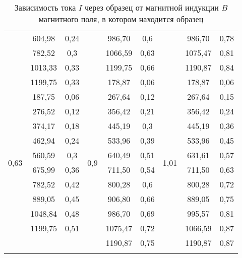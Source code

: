 \begin{longtable}{|c|c|c||c|c|c||c|c|c|}
                       & 604,98  & 0,24 &                       & 986,70  & 0,6  &                        & 986,70  & 0,78 \\ \cline{2-3} \cline{5-6} \cline{8-9} 
                       & 782,52  & 0,3  &                       & 1066,59 & 0,63 &                        & 1075,47 & 0,81 \\ \cline{2-3} \cline{5-6} \cline{8-9} 
                       & 1013,33 & 0,33 &                       & 1199,75 & 0,66 &                        & 1190,87 & 0,84 \\ \cline{2-9} 
                       & 1199,75 & 0,33 & \multirow{12}{*}{0,9} & 178,87  & 0,06 & \multirow{12}{*}{1,01} & 178,87  & 0,06 \\ \cline{1-3} \cline{5-6} \cline{8-9} 
\multirow{10}{*}{0,63} & 187,75  & 0,06 &                       & 267,64  & 0,12 &                        & 267,64  & 0,15 \\ \cline{2-3} \cline{5-6} \cline{8-9} 
                       & 276,52  & 0,12 &                       & 356,42  & 0,21 &                        & 356,42  & 0,24 \\ \cline{2-3} \cline{5-6} \cline{8-9} 
                       & 374,17  & 0,18 &                       & 445,19  & 0,3  &                        & 445,19  & 0,36 \\ \cline{2-3} \cline{5-6} \cline{8-9} 
                       & 462,94  & 0,24 &                       & 533,96  & 0,39 &                        & 533,96  & 0,45 \\ \cline{2-3} \cline{5-6} \cline{8-9} 
                       & 560,59  & 0,3  &                       & 640,49  & 0,51 &                        & 631,61  & 0,57 \\ \cline{2-3} \cline{5-6} \cline{8-9} 
                       & 675,99  & 0,36 &                       & 711,50  & 0,54 &                        & 711,50  & 0,63 \\ \cline{2-3} \cline{5-6} \cline{8-9} 
                       & 782,52  & 0,42 &                       & 800,28  & 0,6  &                        & 800,28  & 0,72 \\ \cline{2-3} \cline{5-6} \cline{8-9} 
                       & 889,05  & 0,45 &                       & 906,80  & 0,66 &                        & 889,05  & 0,75 \\ \cline{2-3} \cline{5-6} \cline{8-9} 
                       & 1048,84 & 0,48 &                       & 986,70  & 0,69 &                        & 995,57  & 0,81 \\ \cline{2-3} \cline{5-6} \cline{8-9} 
                       & 1199,75 & 0,51 &                       & 1075,47 & 0,72 &                        & 1066,59 & 0,87 \\ \cline{1-3} \cline{5-6} \cline{8-9} 
\multicolumn{3}{c|}{}                  &
& 1190,87 & 0,75 &
& 1190,87 & 0,87 \\ \cline{4-9}
\captionsetup{justification=centering}
\caption{Зависимость тока $I$ через
образец от магнитной индукции $B$
магнитного поля, в котором находится
образец }
\end{longtable}

